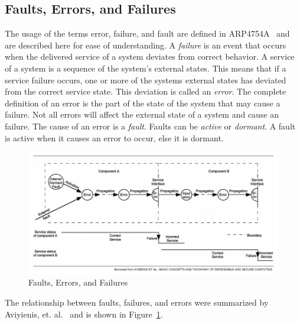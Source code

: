 \subsection{Faults, Errors, and Failures}
\label{sec:terminology}
The usage of the terms error, failure, and fault are defined in ARP4754A~\cite{SAE:ARP4754A} and are described here for ease of understanding. A \textit{failure} is an event that occurs when the delivered service of a system deviates from correct behavior. A service of a system is a sequence of the system's external states. This means that if a service failure occurs, one or more of the systems external states has deviated from the correct service state. This deviation is called an \textit{error}. The complete definition of an error is the part of the state of the system that may cause a failure. Not all errors will affect the external state of a system and cause an failure. The cause of an error is a \textit{fault}. Faults can be \textit{active} or \textit{dormant}. A fault is active when it causes an error to occur, else it is dormant.

\begin{figure}
	\centering
	\includegraphics[width=1.0\textwidth]{images/fault_error_failure.png}
	\caption{Faults, Errors, and Failures}
	\label{fig:fault_error_failure}
\end{figure}

The relationship between faults, failures, and errors were summarized by Aviyienis, et. al.~\cite{basicConcepts} and is shown in Figure~\ref{fig:fault_error_failure}.

